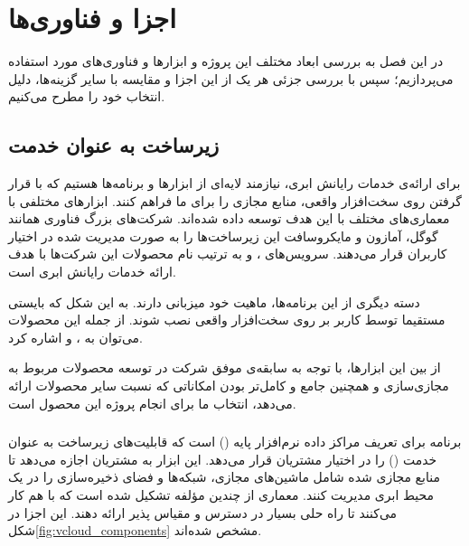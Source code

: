 \chapter{اجزا و فناوری‌ها}
در این فصل به بررسی ابعاد مختلف این پروژه و ابزار‌ها و فناوری‌های مورد استفاده می‌پردازیم؛ سپس با بررسی  جزئی هر یک از این اجزا و مقایسه با سایر گزینه‌ها، دلیل انتخاب خود را مطرح می‌کنیم.

\section{زیرساخت به عنوان خدمت}
برای ارائه‌ی خدمات رایانش ابری، نیازمند لایه‌ای از ابزارها و برنامه‌ها هستیم که با قرار گرفتن روی سخت‌افزار واقعی، منابع مجازی را برای ما فراهم کنند. ابزارهای مختلفی با معماری‌های مختلف با این هدف توسعه داده شده‌اند. شرکت‌های بزرگ فناوری همانند گوگل، آمازون و مایکروسافت این زیرساخت‌ها را به صورت مدیریت شده در اختیار کاربران قرار می‌دهند. سرویس‌های ،  و  به ترتیب نام محصولات این شرکت‌ها با هدف ارائه خدمات رایانش ابری است.

دسته دیگری از این برنامه‌ها، ماهیت خود میزبانی دارند. به این شکل که بایستی مستقیما توسط کاربر بر روی سخت‌افزار واقعی نصب شوند. از جمله این محصولات می‌توان به ،   و  اشاره کرد.

از بین این ابزارها، با توجه به سابقه‌ی موفق شرکت  در توسعه محصولات مربوط به مجازی‌سازی و همچنین جامع و کامل‌تر بودن امکاناتی که  نسبت سایر محصولات ارائه می‌دهد، انتخاب ما برای انجام پروژه این محصول است.

\clearpage
\subsection{}
برنامه  برای تعریف مراکز داده نرم‌افزار پایه () است که قابلیت‌های زیرساخت به عنوان خدمت () را در اختیار مشتریان قرار می‌دهد. این ابزار به مشتریان اجازه می‌دهد تا منابع مجازی شده شامل ماشین‌های مجازی، شبکه‌ها و فضای ذخیره‌سازی را در یک محیط ابری مدیریت کنند. معماری  از چندین مؤلفه تشکیل شده است که با هم کار می‌کنند تا راه حلی بسیار در دسترس و مقیاس پذیر ارائه دهند. این اجزا در شکل\ref{fig:vcloud_components} مشخص شده‌اند.

